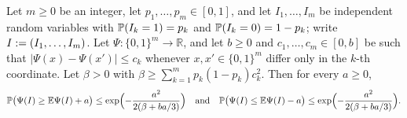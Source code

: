 \begin{lemma}\label{s1:lemBBD}
Let $m\ge0$ be an integer, let $p_1,\dots,p_m\in[0,1]$, and let
$I_1,\dots,I_m$ be independent random variables with $\mathbb{P}(I_k=1)=p_k$ and
$\mathbb{P}(I_k=0)=1-p_k$; write $I\mathrel{:=}(I_1,\dots,I_m)$. Let
$\Psi\colon\{0,1\}^m\to\mathbb{R}$, and let $b\ge0$ and
$c_1,\dots,c_m\in[0,b]$ be such that $|\Psi(x)-\Psi(x')|\le c_k$ whenever
$x,x'\in\{0,1\}^m$ differ only in the $k$-th coordinate. Let $\beta>0$ with
$\beta\ge\sum_{k=1}^mp_k(1-p_k)c_k^2$. Then for every $a\ge0$,
\[
\mathbb{P}\bigl(\Psi(I)\ge\mathbb{E}\Psi(I)+a\bigr)\le\exp\Bigl(-\frac{a^2}{2(\beta+ba/3)}\Bigr)
\quad\text{and}\quad
\mathbb{P}\bigl(\Psi(I)\le\mathbb{E}\Psi(I)-a\bigr)\le\exp\Bigl(-\frac{a^2}{2(\beta+ba/3)}\Bigr).
\]
\end{lemma}
